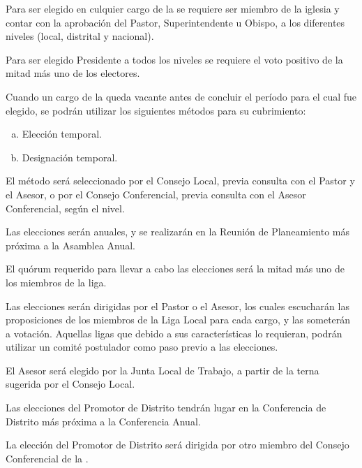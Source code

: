 \label{elecciones}


\article
\label{requisito-cargos}
Para ser elegido en culquier cargo de la \LMJ{} se requiere ser miembro de la iglesia y contar con la aprobación del Pastor, Superintendente u Obispo, a los diferentes niveles (local, distrital y nacional).

\article
\label{requisito-presidente}
Para ser elegido Presidente a todos los niveles se requiere el voto positivo de la mitad más uno de los electores.

\article
\label{cargos-vacantes}
Cuando un cargo de la \LMJ{} queda vacante antes de concluir el período para el cual fue elegido, se podrán utilizar los siguientes métodos para su cubrimiento:
\begin{enumerate}[a)]
    \item Elección temporal.
    \item Designación temporal.
\end{enumerate}
El método será seleccionado por el Consejo Local, previa consulta con el Pastor y el Asesor, o por el Consejo Conferencial, previa consulta con el Asesor Conferencial, según el nivel.


\article
Las elecciones serán anuales, y se realizarán en la Reunión de Planeamiento más próxima a la Asamblea Anual.

\article
El quórum requerido para llevar a cabo las elecciones será la mitad más uno de los miembros de la liga.

\article
Las elecciones serán dirigidas por el Pastor o el Asesor, los cuales escucharán las proposiciones de los miembros de la Liga Local para cada cargo, y las someterán a votación. Aquellas ligas que debido a sus características lo requieran, podrán utilizar un comité postulador como paso previo a las elecciones.

\article
El Asesor será elegido por la Junta Local de Trabajo, a partir de la terna sugerida por el Consejo Local.


\article
Las elecciones del Promotor de Distrito tendrán lugar en la Conferencia de Distrito más próxima a la Conferencia Anual.

\article
\label{direccion-eleccion-promotor}
La elección del Promotor de Distrito será dirigida por otro miembro del Consejo Conferencial de la \LMJ{}.

